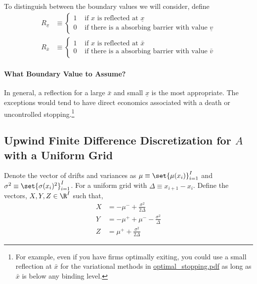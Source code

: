 \documentclass[11pt]{etk-article}
\begin{document}
To distinguish between the boundary values we will consider, define
\begin{align}
	R_{\underline{x}} &\equiv \begin{cases}
		1 & \text{ if $x$ is reflected at $\underline{x}$}\\
		0 & \text{ if there is a absorbing barrier with value $\underline{v}$}
	\end{cases}\label{eq:R-x-min}\\
	R_{\bar{x}} &\equiv \begin{cases}
	1 & \text{ if $x$ is reflected at $\bar{x}$}\\
	0 & \text{ if there is a absorbing barrier with value $\bar{v}$}
\end{cases}\label{eq:R-x-max}
\end{align}	
\paragraph{What Boundary Value to Assume?}
In general, a reflection for a large $\bar{x}$ and small $\underline{x}$ is the most appropriate.  The exceptions would tend to have direct economics associated with a death or uncontrolled stopping.\footnote{For example, even if you have firms optimally exiting, you could use a small reflection at $\bar{x}$ for the variational methods in \url{optimal_stopping.pdf} as long as $\bar{x}$ is below any binding level.}

\subsection{Upwind Finite Difference Discretization for $A$ with a Uniform Grid}
Denote the vector of drifts and variances as $\mu \equiv \set{\mu(x_i)}_{i=1}^I$ and $\sigma^2 \equiv \set{\sigma(x_i)^2}_{i=1}^I$.  For a uniform grid with $\Delta \equiv x_{i+1} - x_i$.  Define the vectors, $X,Y,Z \in \R^I$ such that,
\begin{align}
	X &= - \mu^{-}+ \frac{\sigma^{2}}{2 \Delta}\label{eq:X} \\
	Y &= - \mu^{+} + \mu^{-}- \frac{\sigma^{2}}{\Delta}\label{eq:Y} \\
	Z &= \mu^{+} + \frac{\sigma^{2}}{2 \Delta}\label{eq:Z}
\end{align}
\end{document}
